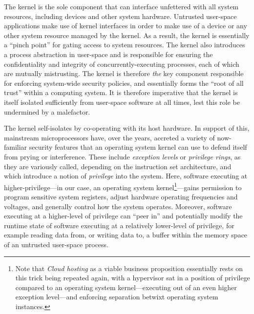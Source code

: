 \documentclass[a4paper, UKenglish, cleveref, autoref, thm-restate, colorlinks]{lipics-v2021}
\begin{document}
The kernel is the sole component that can interface unfettered with all system resources, including devices and other system hardware.
Untrusted user-space applications make use of kernel interfaces in order to make use of a device or any other system resource managed by the kernel.
As a result, the kernel is essentially a ``pinch point'' for gating access to system resources.
The kernel also introduces a process abstraction in user-space and is responsible for ensuring the confidentiality and integrity of concurrently-executing processes, each of which are mutually mistrusting.
The kernel is therefore \emph{the} key component responsible for enforcing system-wide security policies, and essentially forms the ``root of all trust'' within a computing system.
It is therefore imperative that the kernel is itself isolated sufficiently from user-space software at all times, lest this role be undermined by a malefactor.

The kernel self-isolates by co-operating with its host hardware.
In support of this, mainstream microprocessors have, over the years, accreted a variety of now-familiar security features that an operating system kernel can use to defend itself from prying or interference.
These include \emph{exception levels} or \emph{privilege rings}, as they are variously called, depending on the instruction set architecture, and which introduce a notion of \emph{privilege} into the system.
Here, software executing at higher-privilege---in our case, an operating system kernel\footnote{Note that \emph{Cloud hosting} as a viable business proposition essentially rests on this trick being repeated again, with a hypervisor sat in a position of privilege compared to an operating system kernel---executing out of an even higher exception level---and enforcing separation betwixt operating system instances.}---gains permission to program sensitive system registers, adjust hardware operating frequencies and voltages, and generally control how the system operates.
Moreover, software executing at a higher-level of privilege can ``peer in'' and potentially modify the runtime state of software executing at a relatively lower-level of privilege, for example reading data from, or writing data to, a buffer within the memory space of an untrusted user-space process.
\end{document}
